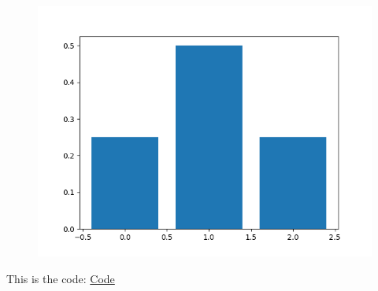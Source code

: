 \documentclass[10pt,twocolumn]{article}
\begin{document}
\begin{figure}[h]
    \centering
\includegraphics[width=\columnwidth]{fig/11.16.3.2.png}
\end{figure}
This is the code: \href{https://github.com/ShreyaniReddy/IITH-FWC/blob/main/probability/11.16.3.2/codes/11.16.3.2.py}{Code}
\end{document}
